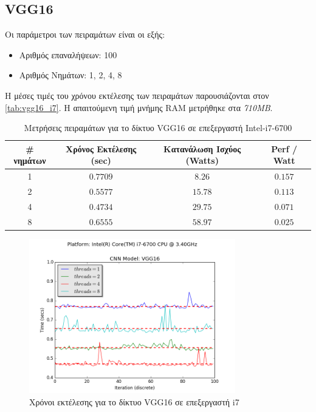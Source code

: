 
\subsection{VGG16}

Οι παράμετροι των πειραμάτων είναι οι εξής:
\begin{itemize}
  \item{Αριθμός επαναλήψεων: 100}
  \item{Αριθμός Νημάτων: 1, 2, 4, 8}
\end{itemize}

Η μέσες τιμές του χρόνου εκτέλεσης των πειραμάτων παρουσιάζονται στον \autoref{tab:vgg16_i7}.
Η απαιτούμενη τιμή μνήμης RAM μετρήθηκε στα \emph{710MB}.

\begin{table}[H]
  \begin{center}
    \caption{Μετρήσεις πειραμάτων για το δίκτυο VGG16 σε επεξεργαστή Intel-i7-6700}
    \label{tab:vgg16_i7}
    \begin{tabular}{ | c | c | c | c | }
      \hline
      \rowcolor{Gray}
      \# νημάτων & Χρόνος Εκτέλεσης (sec) & Κατανάλωση Ισχύος (Watts) & Perf / Watt \\
      \hline
      1 & $0.7709$ & $8.26$ & $0.157$ \\
      2 & $0.5577$ & $15.78$ & $0.113$ \\
      4 & $0.4734$ & $29.75$ & $0.071$ \\
      8 & $0.6555$ & $58.97$ & $0.025$ \\
      \hline
    \end{tabular}
  \end{center}
\end{table}

\begin{figure}[H]
  \centering
  \includegraphics[width=0.8\textwidth]{./images/chapter6/benchmark_vgg16_i7.png}
  \caption[Χρόνoι εκτέλεσης για το δίκτυο VGG16 σε επεξεργαστή i7]{Χρόνοι εκτέλεσης για το δίκτυο VGG16 σε επεξεργαστή i7}
  \label{fig:vgg16_results_i7}
\end{figure}



